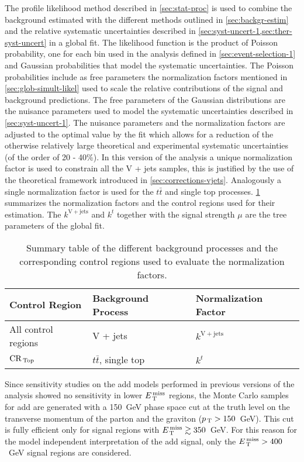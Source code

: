 The profile likelihood method described in \cref{sec:stat-proc} is used to
combine the background estimated with the different methods outlined in
\cref{sec:backgr-estim} and the relative systematic uncertainties described in
\cref{sec:syst-uncert-1,sec:ther-syst-uncert} in a global fit. The likelihood
function is the product of Poisson probability, one for each bin used in the
analysis defined in \cref{sec:event-selection-1} and Gaussian probabilities that
model the systematic uncertainties. The Poisson probabilities include as free
parameters the normalization factors mentioned in \cref{sec:glob-simult-likel}
used to scale the relative contributions of the signal and background
predictions. The free parameters of the Gaussian distributions are the nuisance
parameters used to model the systematic uncertainties described in
\cref{sec:syst-uncert-1}. The nuisance parameters and the normalization factors
are adjusted to the optimal value by the fit which allows for a reduction of the
otherwise relatively large theoretical and experimental systematic uncertainties
(of the order of 20 - 40\%).  In this version of the analysis a unique
normalization factor is used to constrain all the V + jets samples, this is
justified by the use of the theoretical framework introduced in
\cref{sec:corrections-vjets}. Analogously a single normalization factor is used
for the $t \bar{t}$ and single top processes. \cref{tab:norm_factors_2016}
summarizes the normalization factors and the control regions used for their
estimation. The $k^\mathrm{V + jets}$ and $k^t$ together with the signal
strength $\mu$ are the tree parameters of the global fit.
\begin{table}[!h]
  \centering
  \begin{tabular}{lll}
    \toprule
    Control Region & Background Process & Normalization Factor \\
    \midrule \midrule
    All control regions & V + jets & $k^\mathrm{V + jets}$ \\
    $\mathrm{CR}_\mathrm{\, Top}$ & $t \bar{t}$, single top & $k^t$ \\
    \bottomrule
  \end{tabular}
  \caption{Summary table of the different background processes and the
    corresponding control regions used to evaluate the normalization factors.}
  \label{tab:norm_factors_2016}
\end{table}

Since sensitivity studies on the \gls{add} models performed in previous versions
of the analysis showed no sensitivity in lower $E_\mathrm{\, T}^\mathrm{\, miss}$ regions, the Monte Carlo
samples for \gls{add} are generated with a 150~GeV phase space cut at the truth
level on the transverse momentum of the parton and the graviton
($p_\mathrm{\, T} > 150$~GeV). This cut is fully efficient only for signal regions with
$E_\mathrm{\, T}^\mathrm{\, miss} \gtrsim 350$~GeV. For this reason for the model independent interpretation
of the \gls{add} signal, only the $E_\mathrm{\, T}^\mathrm{\, miss} > 400$~GeV signal regions are
considered.
